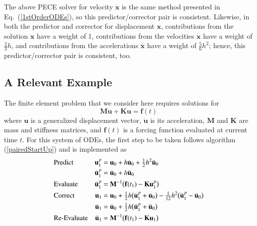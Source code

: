 The above PECE solver for velocity $\dot{\mathbf{x}}$ is the same method presented in Eq.~(\ref{1stOrderODEs}), so this predictor\slash corrector pair is consistent.  Likewise, in both the predictor and corrector for displacement $\mathbf{x}$, contributions from the solution $\mathbf{x}$ have a weight of 1, contributions from the velocities $\dot{\mathbf{x}}$ have a weight of $\tfrac{2}{3} h$, and contributions from the accelerations $\ddot{\mathbf{x}}$ have a weight of $\tfrac{5}{6} h^2$; hence, this predictor\slash corrector pair is consistent, too.

\subsection{A Relevant Example}
\label{sec:solve2ndOrderODE}

The finite element problem that we consider here requires solutions for
\begin{displaymath}
    \mathbf{M} \ddot{\mathbf{u}} + \mathbf{K}\mathbf{u} = \mathbf{f}(t)
\end{displaymath}
where $\mathbf{u}$ is a generalized displacement vector, $\ddot{\mathbf{u}}$ is its acceleration, $\mathbf{M}$ and $\mathbf{K}$ are mass and stiffness matrices, and $\mathbf{f}(t)$ is a forcing function evaluated at current time $t$.  For this system of ODEs, the first step to be taken follows algorithm (\ref{pairedStartUp}) and is implemented as
\begin{subequations}
    \notag
    \begin{align}
    \mbox{} & \text{Predict} & 
    \mathbf{u}_1^p & = \mathbf{u}_0 + h \dot{\mathbf{u}}_0 +
    \tfrac{1}{2} h^2 \ddot{\mathbf{u}}_0 \\
    \mbox{} & &
    \dot{\mathbf{u}}^p_1 & = \dot{\mathbf{u}}_0 + h \ddot{\mathbf{u}}_0 \\
    \mbox{} & \text{Evaluate} &
    \ddot{\mathbf{u}}^p_1 & = \mathbf{M}^{-1} \bigl( \mathbf{f}(t_{1} ) - 
    \mathbf{K} \mathbf{u}_1^p \bigr) \\
    \mbox{} & \text{Correct} &
    \mathbf{u}_1 & = \mathbf{u}_0 + \tfrac{1}{2} h 
    \bigl( \dot{\mathbf{u}}^p_1 + \dot{\mathbf{u}}_0 \bigr) -
    \tfrac{1}{12} h^2 \bigl( \ddot{\mathbf{u}}^p_1 - \ddot{\mathbf{u}}_0 \bigr) \\
    \mbox{} & &
    \dot{\mathbf{u}}_1 & = \dot{\mathbf{u}}_0 + \tfrac{1}{2} h 
    \bigl( \ddot{\mathbf{u}}_1^p + \ddot{\mathbf{u}}_0 \bigr) \\
    \mbox{} & \text{Re-Evaluate} &
    \ddot{\mathbf{u}}_1 & = \mathbf{M}^{-1} \bigl( \mathbf{f}(t_1 ) - 
    \mathbf{K} \mathbf{u}_1 \bigr)
    \end{align}
\end{subequations}
